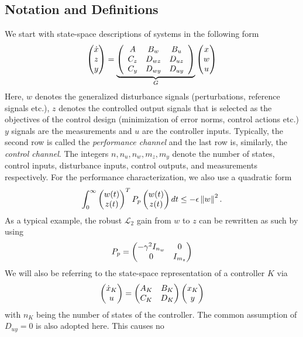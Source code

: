 \subsection{Notation and Definitions}
We start with state-space descriptions of systems in the following form 
\begin{equation}
\begin{pmatrix}\dot{x}\\ z\\ y\end{pmatrix} = 
\underbrace{\left(
\begin{array}{ccc}
	A    &B_w    &B_u\\
	C_z  &D_{wz} &D_{uz}\\
	C_y  &D_{wy} &D_{uy}
\end{array}
\right)}_{G}
\begin{pmatrix}x\\ w\\ u\end{pmatrix}
\label{eq:gennomplant}
\end{equation}
Here, $w$ denotes the generalized disturbance signals (perturbations, reference signals etc.), $z$ denotes the controlled
output signals that is selected as the objectives of the control design (minimization of error norms, control actions etc.)
$y$ signals are the measurements and $u$ are the controller inputs. Typically, the second row is called the \emph{performance 
channel} and the last row is, similarly, the \emph{control channel}. The integers $n,n_u,n_w,m_z,m_y$ denote the number of 
states, control inputs, disturbance inputs, control outputs, and measurements respectively. For the performance characterization, 
we also use a quadratic form 
\begin{equation}
\int_0^\infty{\begin{pmatrix}w(t) \\ z(t)\end{pmatrix}^TP_p \begin{pmatrix}w(t) \\ z(t)\end{pmatrix} dt} \leq -\epsilon\displaystyle \left\| w \right\|^2.
\label{eq:quadperf}
\end{equation}
As a typical example, the robust $\mathcal{L}_2$ gain from $w$ to $z$ can be rewritten as such by using 
\[
P_p = \begin{pmatrix}-\gamma^2I_{n_w} &0\\ 0&I_{m_z}\end{pmatrix}
\]
We will also be referring to the state-space representation of a controller $K$ via
\begin{equation}
\begin{pmatrix}\dot{x}_K\\ u\end{pmatrix} = 
\begin{pmatrix}
	A_K  &B_K\\
	C_K  &D_K
\end{pmatrix}
\begin{pmatrix}x_K\\ y\end{pmatrix}
\label{eq:contmats}
\end{equation}
with $n_K$ being the number of states of the controller. The common assumption of $D_{uy}=0$ is also adopted here. This causes no 
